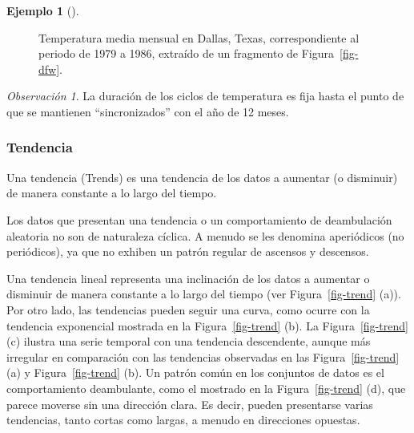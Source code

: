 \documentclass[
  us-letterpaper,
]{scrreprt}
\theoremstyle{plain}
\theoremstyle{definition}
\theoremstyle{definition}
\newtheorem{example}{Ejemplo}[chapter]
\theoremstyle{remark}
\newtheorem*{remark}{Observación}
\begin{document}
\begin{example}[]
\begin{tcolorbox}
\begin{figure}[H]
{}

\caption{\label{fig-dfwtem}Temperatura media mensual en Dallas, Texas,
correspondiente al periodo de 1979 a 1986, extraído de un fragmento de
Figura~\ref{fig-dfw}.}

\end{figure}%

\begin{remark}
La duración de los ciclos de temperatura es fija hasta el punto de que
se mantienen ``sincronizados'' con el año de 12 meses.
\end{remark}

\end{tcolorbox}

\end{example}

\subsubsection{Tendencia}\label{tendencia}

Una tendencia (Trends) es una tendencia de los datos a aumentar (o
disminuir) de manera constante a lo largo del tiempo.

Los datos que presentan una tendencia o un comportamiento de
deambulación aleatoria no son de naturaleza cíclica. A menudo se les
denomina aperiódicos (no periódicos), ya que no exhiben un patrón
regular de ascensos y descensos.

Una tendencia lineal representa una inclinación de los datos a aumentar
o disminuir de manera constante a lo largo del tiempo (ver
Figura~\ref{fig-trend} (a)). Por otro lado, las tendencias pueden seguir
una curva, como ocurre con la tendencia exponencial mostrada en la
Figura~\ref{fig-trend} (b). La Figura~\ref{fig-trend} (c) ilustra una
serie temporal con una tendencia descendente, aunque más irregular en
comparación con las tendencias observadas en las Figura~\ref{fig-trend}
(a) y Figura~\ref{fig-trend} (b). Un patrón común en los conjuntos de
datos es el comportamiento deambulante, como el mostrado en la
Figura~\ref{fig-trend} (d), que parece moverse sin una dirección clara.
Es decir, pueden presentarse varias tendencias, tanto cortas como
largas, a menudo en direcciones opuestas.
\end{document}
